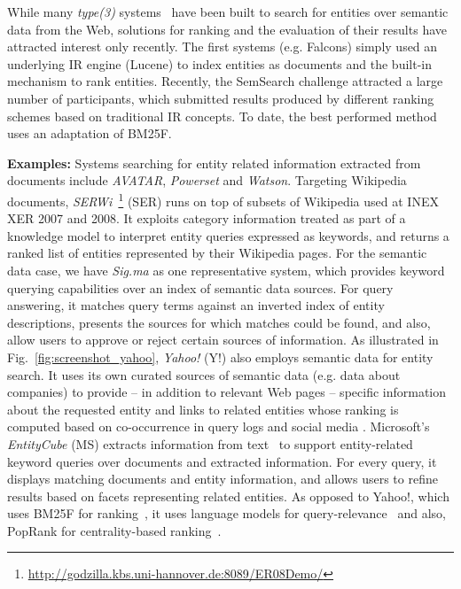 While many \emph{type(3)} systems~\cite{DBLP:journals/ijswis/ChengQ09,DBLP:journals/ws/TummarelloCCDDD10,DBLP:journals/ws/TranWH09} have been built to search for entities over semantic data from the Web, solutions for ranking and the evaluation of their results have attracted interest only recently. The first systems (e.g. Falcons) simply used an underlying IR engine (Lucene) to index entities as documents and the built-in mechanism to rank entities. Recently, the SemSearch challenge attracted a large number of participants, which submitted results produced by different ranking schemes based on traditional IR concepts. To date, the best performed method~\cite{DBLP:conf/semweb/BlancoMV11} uses an adaptation of BM25F. 


\textbf{Examples:}
Systems searching for entity related information extracted from documents include \emph{AVATAR}, \emph{Powerset} and \emph{Watson}. Targeting Wikipedia documents, \emph{SERWi}~\footnote{\url{http://godzilla.kbs.uni-hannover.de:8089/ER08Demo/}} (SER) runs on top of subsets of Wikipedia used at INEX XER 2007 and 2008. It exploits category information treated as part of a knowledge model to interpret entity queries expressed as keywords, and returns a ranked list of entities represented by their Wikipedia pages. For the semantic data case, we have \emph{Sig.ma} as one representative system, which provides keyword querying capabilities over an index of semantic data sources. For query answering, it matches query terms against an inverted index of entity descriptions, presents the sources for which matches could be found, and also, allow users to approve or reject certain sources of information. As illustrated in Fig.~\ref{fig:screenshot_yahoo}, \emph{Yahoo!} (Y!) also employs semantic data for entity search. It uses its own curated sources of semantic data (e.g. data about companies) to provide -- in addition to relevant Web pages -- specific information about the requested entity and links to related entities whose ranking is computed based on co-occurrence in query logs and social media \cite{vanZwol:2010:FEI:1772690.1772788}. Microsoft's \emph{EntityCube} (MS) extracts information from text~\cite{DBLP:conf/www/ZhuNLZW09} to support entity-related keyword queries over documents and extracted information. For every query, it displays matching documents and entity information, and allows users to refine results based on facets representing related entities. As opposed to Yahoo!, which uses BM25F for ranking~\cite{DBLP:conf/semweb/BlancoMV11}, it uses language models for query-relevance~\cite{DBLP:conf/www/NieMSWM07} and also, PopRank for centrality-based ranking~\cite{DBLP:conf/www/NieZWM05}. 


